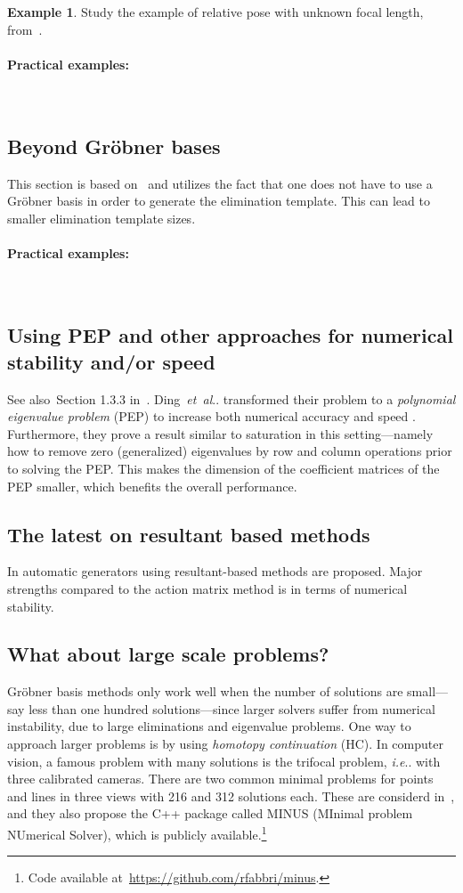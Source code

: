\documentclass[11pt,a4paper]{article}
\makeatletter
\theoremstyle{definition}
\newtheorem{example}{Example}
\DeclareRobustCommand\etal{\emph{et~al}\@ifnextchar.{}{.\@}}
\DeclareRobustCommand\ie{\emph{i.e}\@ifnextchar.{}{.\@}}
\newcommand{\pexamples}{\paragraph{Practical examples:}}
\makeatother
\begin{document}
\begin{example}
Study the example of relative pose with unknown focal length,
from~\cite{kukelova-etal-2017-cvpr}.
\end{example}

\pexamples~\cite{kukelova-etal-2017-cvpr,ding-etal-2019-iccv,barath-kukelova-iccv-2019,valtonenoernhag-icpram-2019}

\subsection{Beyond Gröbner bases}
This section is based on~\cite{larsson2018cvpr} and utilizes the fact that one does not
have to use a Gröbner basis in order to generate the elimination template.
This can lead to smaller elimination template sizes.

\pexamples~\cite{valtonenoernhag-springer-2021}

\subsection{Using PEP and other approaches for numerical stability and/or speed}
See also~Section 1.3.3 in~\cite{larsson-phd}.
Ding~\etal{} transformed their problem to a \emph{polynomial eigenvalue problem} (PEP)
to increase both numerical accuracy and speed \cite{ding-etal-tpami-2020,ding-etal-cvpr-2020}.
Furthermore, they prove a result similar to saturation in this setting---namely how to remove
zero (generalized) eigenvalues by row and column operations prior to solving the PEP. This makes the dimension
of the coefficient matrices of the PEP smaller, which benefits the overall performance.

\subsection{The latest on resultant based methods}
In \cite{bhayani-etal-cvpr-2020,bhayani-etal-arxiv-2020} automatic generators using
resultant-based methods are proposed. Major strengths compared to the action matrix method is
in terms of numerical stability.

\subsection{What about large scale problems?}
Gröbner basis methods only work well when the number of solutions are small---say less than one
hundred solutions---since larger solvers suffer from numerical instability, due to large eliminations
and eigenvalue problems. One way to approach larger problems is by using \emph{homotopy continuation} (HC). In computer vision, a famous problem with many solutions is the trifocal problem, \ie{} with
three calibrated cameras. There are two common minimal problems for points and lines in three views
with 216 and 312 solutions each. These are considerd in~\cite{fabbri-etal-cvpr-2020}, and they also
propose the C++ package called MINUS (MInimal problem NUmerical Solver), which is publicly available.\footnote{Code available at~\url{https://github.com/rfabbri/minus}.}

\clearpage

{\small
}
\end{document}
